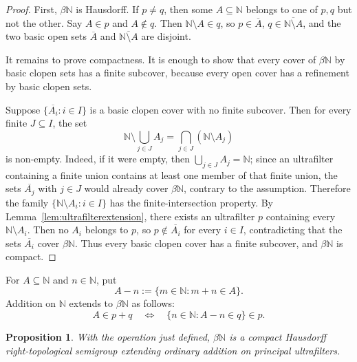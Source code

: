 \documentclass[11pt]{article}
\newtheorem{proposition}[theorem]{Proposition}
\newcommand{\NN}{\mathbb N}
\newcommand{\cl}[1]{\overline{#1}}
\begin{document}
\begin{proof}
First, $\beta\NN$ is Hausdorff. If $p\neq q$, then some $A\subseteq\NN$ belongs to one of $p,q$ but not the other. Say $A\in p$ and $A\notin q$. Then $\NN\setminus A\in q$, so $p\in\cl A$, $q\in\cl{\NN\setminus A}$, and the two basic open sets $\cl A$ and $\cl{\NN\setminus A}$ are disjoint.

It remains to prove compactness. It is enough to show that every cover of $\beta\NN$ by basic clopen sets has a finite subcover, because every open cover has a refinement by basic clopen sets.

Suppose $\{\cl{A_i}:i\in I\}$ is a basic clopen cover with no finite subcover. Then for every finite $J\subseteq I$, the set
\[
    \NN\setminus\bigcup_{j\in J}A_j
    =\bigcap_{j\in J}(\NN\setminus A_j)
\]
is non-empty. Indeed, if it were empty, then $\bigcup_{j\in J}A_j=\NN$; since an ultrafilter containing a finite union contains at least one member of that finite union, the sets $\cl{A_j}$ with $j\in J$ would already cover $\beta\NN$, contrary to the assumption. Therefore the family $\{\NN\setminus A_i:i\in I\}$ has the finite-intersection property. By Lemma~\ref{lem:ultrafilterextension}, there exists an ultrafilter $p$ containing every $\NN\setminus A_i$. Then no $A_i$ belongs to $p$, so $p\notin\cl{A_i}$ for every $i\in I$, contradicting that the sets $\cl{A_i}$ cover $\beta\NN$. Thus every basic clopen cover has a finite subcover, and $\beta\NN$ is compact.
\end{proof}

For $A\subseteq\NN$ and $n\in\NN$, put
\[
    A-n:=\{m\in\NN:m+n\in A\}.
\]
Addition on $\NN$ extends to $\beta\NN$ as follows:
\[
    A\in p+q
    \quad\Longleftrightarrow\quad
    \{n\in\NN:A-n\in q\}\in p.
\]

\begin{proposition}\label{prop:betasemigroup}
With the operation just defined, $\beta\NN$ is a compact Hausdorff right-topological semigroup extending ordinary addition on principal ultrafilters.
\end{proposition}
\end{document}
